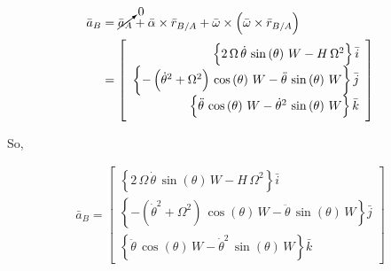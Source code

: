 \documentclass[12pt, letterpaper]{../assignment}
\begin{document}
\begin{equation*}
    \begin{aligned}
    \bar{a}_B &= \cancelto{0}{\bar{a}_A} + \bar{\alpha} \times \bar{r}_{B/A} + \bar{\omega} \times \left( \bar{\omega} \times \bar{r}_{B/A} \right)  \\
              &= \left[\begin{array}{r} \left\{ 2\,\Omega \,\dot{\theta}\,\sin\left(\theta\right)\,W-H\,\Omega ^2 \right\} \bar{i} \\
                       \left\{ -\left({\dot{\theta}}^2+\Omega ^2\right)\,\cos\left(\theta\right)\,W-\ddot{\theta}\,\sin\left(\theta\right)\,W \right\} \bar{j} \\
                       \left\{ \ddot{\theta}\,\cos\left(\theta\right)\,W-{\dot{\theta}}^2\,\sin\left(\theta\right)\,W \right\} \bar{k}
                    \end{array}\right]
    \end{aligned}
\end{equation*}

So,

\begin{answer}
    \begin{equation*}
        \begin{aligned}
        \bar{a}_B = \left[\begin{array}{r} \left\{ 2\,\Omega \,\dot{\theta}\,\sin\left(\theta\right)\,W-H\,\Omega ^2 \right\} \bar{i} \\
                           \left\{ -\left({\dot{\theta}}^2+\Omega ^2\right)\,\cos\left(\theta\right)\,W-\ddot{\theta}\,\sin\left(\theta\right)\,W \right\} \bar{j} \\
                           \left\{ \ddot{\theta}\,\cos\left(\theta\right)\,W-{\dot{\theta}}^2\,\sin\left(\theta\right)\,W \right\} \bar{k}
                        \end{array}\right]
        \end{aligned}
    \end{equation*}
\end{answer}



\end{document}
